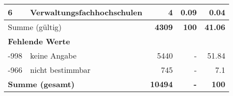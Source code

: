\begin{longtable}{lXrrr}
     6 &
     \multicolumn{1}{X}{ Verwaltungsfachhochschulen   } &


       \num{4} &
       \num[round-mode=places,round-precision=2]{0,09} &
         \num[round-mode=places,round-precision=2]{0,04} \\
     \midrule
     \multicolumn{2}{l}{Summe (gültig)} &
       \textbf{\num{4309}} &
     \textbf{100} &
       \textbf{\num[round-mode=places,round-precision=2]{41,06}} \\
     \multicolumn{5}{l}{\textbf{Fehlende Werte}}\\
       -998 &
       keine Angabe &
         \num{5440} &
        - &
         \num[round-mode=places,round-precision=2]{51,84} \\
       -966 &
       nicht bestimmbar &
         \num{745} &
        - &
         \num[round-mode=places,round-precision=2]{7,1} \\
     \midrule
     \multicolumn{2}{l}{\textbf{Summe (gesamt)}} &
          \textbf{\num{10494}} &
        \textbf{-} &
        \textbf{100} \\
     \bottomrule
     \end{longtable}
     
